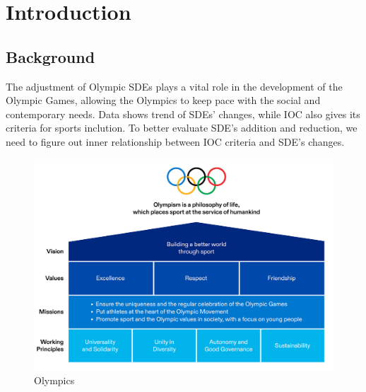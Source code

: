 \documentclass[a4paper]{article}
\begin{document}
\section{Introduction}

\subsection{Background}  
The adjustment of Olympic SDEs plays a vital role in the development of the Olympic Games, allowing the Olympics to keep pace with the social and contemporary needs. Data shows trend of SDEs' changes, while IOC also gives its criteria for sports inclution. To better evaluate SDE's addition and reduction, we need to figure out inner relationship between IOC criteria and SDE's changes.
\begin{figure}[htbp]
    \centering
    \includegraphics[width=14cm]{graph 2.png}
    \caption{Olympics}
\end{figure}
\end{document}
